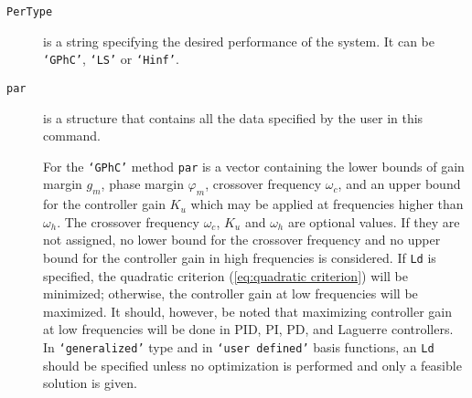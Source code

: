 \documentclass [12pt , a4paper] {report}
\begin{document}
\begin{description}
\item[\texttt{PerType}] is a string specifying the desired performance of the system. It can be \texttt{`GPhC'}, \texttt{`LS'} or \texttt{`Hinf'}. 

             
           
             
 \item[\texttt{par}] is a structure that contains all the data specified by the user in this command.
 
 For the {\texttt{`GPhC'}} method \texttt{par} is a vector containing the lower bounds of gain margin $g_m$, phase margin $\varphi_m$, crossover frequency $\omega_c$, and an upper bound for the controller gain $K_u$ which may be applied at frequencies higher than $\omega_h$. 
The crossover frequency $\omega_c$, $K_u$ and $\omega_h$ are optional values. If they are not assigned, no lower bound for the crossover frequency and  no upper bound for the controller gain in high frequencies is considered.
If \texttt{Ld} is specified, the quadratic criterion (\ref{eq:quadratic criterion}) will be minimized; otherwise, the controller gain at low frequencies will be maximized. It should, however, be noted that maximizing controller gain at low frequencies will be done in PID, PI, PD, and Laguerre controllers. In \texttt{`generalized'} type and in \texttt{`user defined'} basis functions, an \texttt{Ld} should be specified unless no optimization is performed and only a feasible solution is given.
     

\end{description}
\end{document}

